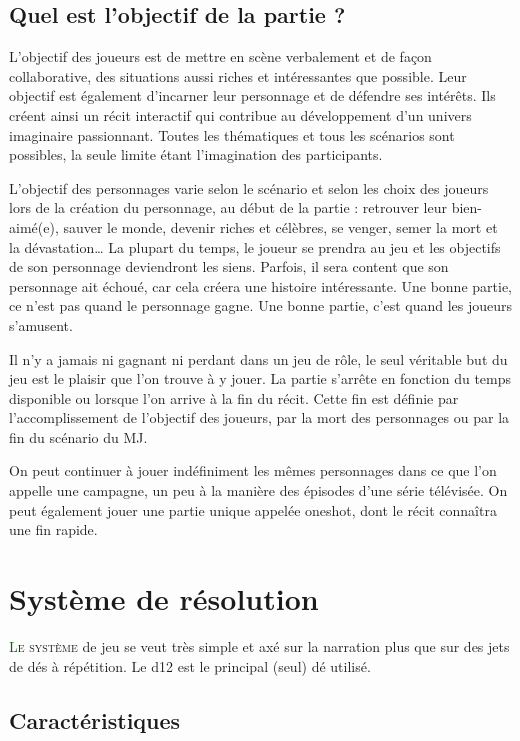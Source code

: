 \subsection*{Quel est l’objectif de la partie ?}

L’objectif des joueurs est de mettre en scène verbalement et de façon collaborative, des situations aussi riches et intéressantes que possible. Leur objectif est également d’incarner leur personnage et de défendre ses intérêts. Ils créent ainsi un récit interactif qui contribue au développement d’un univers imaginaire passionnant. Toutes les thématiques et tous les scénarios sont possibles, la seule limite étant l’imagination des participants.

L’objectif des personnages varie selon le scénario et selon les choix des joueurs lors de la création du personnage, au début de la partie : retrouver leur bien-aimé(e), sauver le monde, devenir riches et célèbres, se venger, semer la mort et la dévastation… La plupart du temps, le joueur se prendra au jeu et les objectifs de son personnage deviendront les siens. Parfois, il sera content que son personnage ait échoué, car cela créera une histoire intéressante. Une bonne partie, ce n’est pas quand le personnage gagne. Une bonne partie, c’est quand les joueurs s’amusent.

Il n’y a jamais ni gagnant ni perdant dans un jeu de rôle, le seul véritable but du jeu est le plaisir que l’on trouve à y jouer. La partie s’arrête en fonction du temps disponible ou lorsque l’on arrive à la fin du récit. Cette fin est définie par l’accomplissement de l’objectif des joueurs, par la mort des personnages ou par la fin du scénario du MJ.

On peut continuer à jouer indéfiniment les mêmes personnages dans ce que l’on appelle une campagne, un peu à la manière des épisodes d’une série télévisée. On peut également jouer une partie unique appelée oneshot, dont le récit connaîtra une fin rapide.

\newpage

\section{Système de résolution}

\lettrine[lines=3]{\initfamily\textcolor{darkgreen}{L}}{e système} de jeu se veut très simple et axé sur la narration plus que sur des jets de dés à répétition. Le d12 est le principal (seul) dé utilisé. 

\subsection{Caractéristiques}

